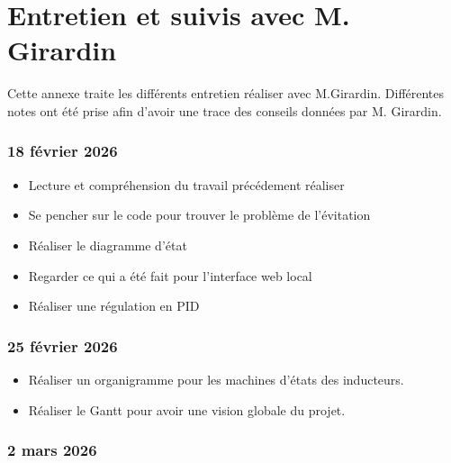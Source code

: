 \chapter{Entretien et suivis avec M. Girardin}
Cette annexe traite les différents entretien réaliser avec M.Girardin. Différentes notes ont été prise afin d'avoir une trace des conseils données par M. Girardin.


\subsection*{18 février 2026}

\begin{itemize}
    \item Lecture et compréhension du travail précédement réaliser

    \item Se pencher sur le code pour trouver le problème de l'évitation

    \item Réaliser le diagramme d'état

    \item Regarder ce qui a été fait pour l'interface web local

    \item Réaliser une régulation en PID
\end{itemize}

\subsection*{25 février 2026}

\begin{itemize}
    \item Réaliser un organigramme pour les machines d'états des inducteurs.

    \item Réaliser le Gantt pour avoir une vision globale du projet.
\end{itemize}

\subsection*{2 mars 2026}

